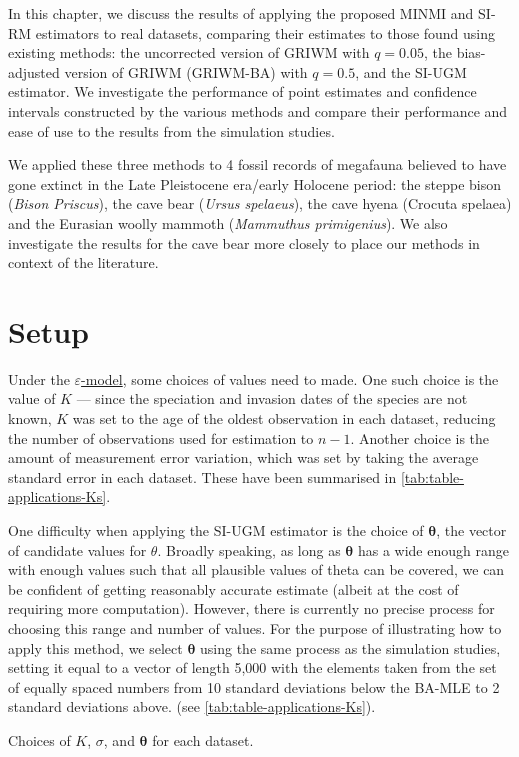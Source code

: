 
In this chapter, we discuss the results of applying the proposed MINMI and SI-RM estimators to real datasets, comparing their estimates to those found using existing methods: the uncorrected version of GRIWM with $q=0.05$, the bias-adjusted version of GRIWM (GRIWM-BA) with $q=0.5$, and the SI-UGM estimator. We investigate the performance of point estimates and confidence intervals constructed by the various methods and compare their performance and ease of use to the results from the simulation studies.

We applied these three methods to 4 fossil records of megafauna believed to have gone extinct in the Late Pleistocene era/early Holocene period: the steppe bison (\textit{Bison Priscus}), the cave bear (\textit{Ursus spelaeus}), the cave hyena (Crocuta spelaea) and the Eurasian woolly mammoth (\textit{Mammuthus primigenius}). We also investigate the results for the cave bear more closely to place our methods in context of the literature.

\section{Setup}

Under the \hyperref[model: measurement-error]{$\varepsilon$-model}, some choices of values need to made. One such choice is the value of $K$ --- since the speciation and invasion dates of the species are not known, $K$ was set to the age of the oldest observation in each dataset, reducing the number of observations used for estimation to $n-1$. Another choice is the amount of measurement error variation, which was set by taking the average standard error in each dataset. These have been summarised in \autoref{tab:table-applications-Ks}.

One difficulty when applying the SI-UGM estimator is the choice of $\bm{\theta}$, the vector of candidate values for $\theta$. Broadly speaking, as long as $\bm{\theta}$ has a wide enough range with enough values such that all plausible values of theta can be covered, we can be confident of getting reasonably accurate estimate (albeit at the cost of requiring more computation). However, there is currently no precise process for choosing this range and number of values. For the purpose of illustrating how to apply this method, we select $\bm{\theta}$ using the same process as the simulation studies, setting it equal to a vector of length 5{\small,}000 with the elements taken from the set of equally spaced numbers from 10 standard deviations below the BA-MLE to 2 standard deviations above. (see \autoref{tab:table-applications-Ks}).
\begin{table}[ht]
    \centering
    \vspace{-6mm}
    \caption{Choices of $K$, $\sigma$, and $\bm{\theta}$ for each dataset.}
    
    \label{tab:table-applications-Ks}
    \vspace{-4mm}
\end{table}

